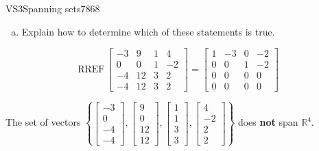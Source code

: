 \begin{exercise}{VS3}{Spanning sets}{7868}
\begin{exerciseStatement}
\begin{enumerate}[(a)]
\begin{itemize}
 
\end{itemize}

     
\item  

 Explain how to determine which of these statements is true. 

 
\end{enumerate}

     \end{exerciseStatement}
 \begin{exerciseAnswer} 

 \[
\mathrm{RREF}\, \left[\begin{array}{cccc}
-3 & 9 & 1 & 4 \\
0 & 0 & 1 & -2 \\
-4 & 12 & 3 & 2 \\
-4 & 12 & 3 & 2
\end{array}\right] = \left[\begin{array}{cccc}
1 & -3 & 0 & -2 \\
0 & 0 & 1 & -2 \\
0 & 0 & 0 & 0 \\
0 & 0 & 0 & 0
\end{array}\right]
            \] 

 

 The set of vectors \(\left\{ \left[\begin{array}{c}
-3 \\
0 \\
-4 \\
-4
\end{array}\right] , \left[\begin{array}{c}
9 \\
0 \\
12 \\
12
\end{array}\right] , \left[\begin{array}{c}
1 \\
1 \\
3 \\
3
\end{array}\right] , \left[\begin{array}{c}
4 \\
-2 \\
2 \\
2
\end{array}\right] \right\}\) does \textbf{not} span \(\mathbb{R}^4\). 

 \end{exerciseAnswer}
 \end{exercise}


